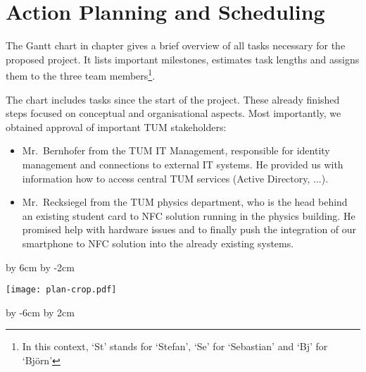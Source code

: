 \section{Action Planning and Scheduling}\label{sec:plan}






The Gantt chart in chapter gives a brief overview of all tasks necessary for the proposed project.
It lists important milestones, estimates task lengths and assigns them to the three team members\footnote{In this context, `St' stands for `Stefan', `Se' for `Sebastian' and `Bj' for `Björn'}.

The chart includes tasks since the start of the project.
These already finished steps focused on conceptual and organisational aspects.
Most importantly, we obtained approval of important TUM stakeholders:
\begin{itemize}
\item Mr.~Bernhofer from the TUM IT Management, responsible for identity management and connections to external IT systems. He provided us with information how to access central TUM services (Active Directory, ...).
\item Mr.~Recksiegel from the TUM physics department, who is the head behind an existing student card to NFC solution running in the physics building. He promised help with hardware issues and to finally push the integration of our smartphone to NFC solution into the already existing systems.
\end{itemize}










\par\vfill\break %

\advance\vsize by 6cm %
\advance\voffset by -2cm %
\centerline{\texttt{[image: plan-crop.pdf]}}
\par\vfill\break %

\advance\vsize by -6cm %
\advance\voffset by 2cm %